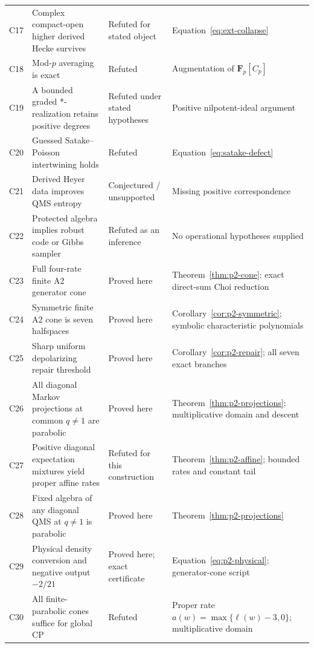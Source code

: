 \documentclass[11pt]{article}
\theoremstyle{remark}\newtheorem{remark}[definition]{Remark}
\begin{document}
{\begin{longtable}{p{.07\linewidth}p{.37\linewidth}p{.20\linewidth}p{.22\linewidth}}
C17 & Complex compact-open higher derived Hecke survives & Refuted for stated object & Equation~\eqref{eq:ext-collapse}\\
C18 & Mod-$p$ averaging is exact & Refuted & Augmentation of $\mathbf F_p[C_p]$\\
C19 & A bounded graded *-realization retains positive degrees & Refuted under stated hypotheses & Positive nilpotent-ideal argument\\
C20 & Guessed Satake--Poisson intertwining holds & Refuted & Equation~\eqref{eq:satake-defect}\\
C21 & Derived Heyer data improves QMS entropy & Conjectured / unsupported & Missing positive correspondence\\
C22 & Protected algebra implies robust code or Gibbs sampler & Refuted as an inference & No operational hypotheses supplied\\
C23 & Full four-rate finite A2 generator cone & Proved here & Theorem~\ref{thm:p2-cone}; exact direct-sum Choi reduction\\
C24 & Symmetric finite A2 cone is seven halfspaces & Proved here & Corollary~\ref{cor:p2-symmetric}; symbolic characteristic polynomials\\
C25 & Sharp uniform depolarizing repair threshold & Proved here & Corollary~\ref{cor:p2-repair}; all seven exact branches\\
C26 & All diagonal Markov projections at common $q\ne1$ are parabolic & Proved here & Theorem~\ref{thm:p2-projections}; multiplicative domain and descent\\
C27 & Positive diagonal expectation mixtures yield proper affine rates & Refuted for this construction & Theorem~\ref{thm:p2-affine}; bounded rates and constant tail\\
C28 & Fixed algebra of any diagonal QMS at $q\ne1$ is parabolic & Proved here & Theorem~\ref{thm:p2-projections}\\
C29 & Physical density conversion and negative output $-2/21$ & Proved here; exact certificate & Equation~\ref{eq:p2-physical}; generator-cone script\\
C30 & All finite-parabolic cones suffice for global CP & Refuted & Proper rate $a(w)=\max\{\ell(w)-3,0\}$; multiplicative domain\\
\bottomrule
\end{longtable}}
\end{document}

